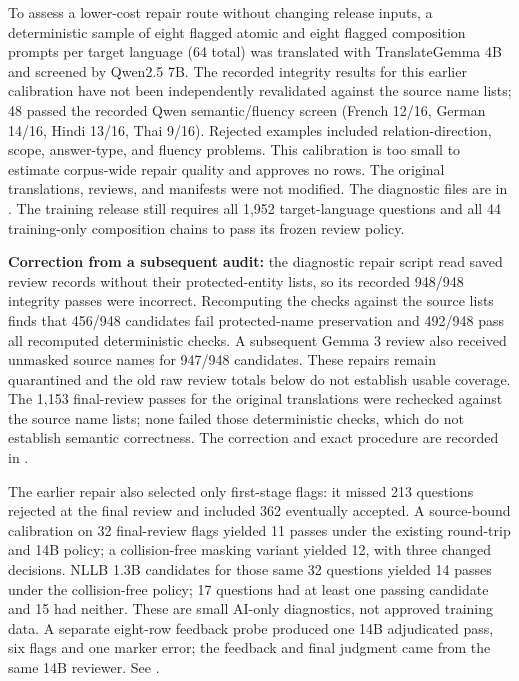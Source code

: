\documentclass[10pt,a4paper]{article}
\begin{document}
To assess a lower-cost repair route without changing release inputs, a deterministic sample of eight flagged atomic and eight flagged composition prompts per target language (64 total) was translated with TranslateGemma 4B and screened by Qwen2.5 7B. The recorded integrity results for this earlier calibration have not been independently revalidated against the source name lists; 48 passed the recorded Qwen semantic/fluency screen (French 12/16, German 14/16, Hindi 13/16, Thai 9/16). Rejected examples included relation-direction, scope, answer-type, and fluency problems. This calibration is too small to estimate corpus-wide repair quality and approves no rows. The original translations, reviews, and manifests were not modified. The diagnostic files are in . The training release still requires all 1,952 target-language questions and all 44 training-only composition chains to pass its frozen review policy.

\textbf{Correction from a subsequent audit:} the diagnostic repair script read saved review records without their protected-entity lists, so its recorded 948/948 integrity passes were incorrect. Recomputing the checks against the source lists finds that 456/948 candidates fail protected-name preservation and 492/948 pass all recomputed deterministic checks. A subsequent Gemma 3 review also received unmasked source names for 947/948 candidates. These repairs remain quarantined and the old raw review totals below do not establish usable coverage. The 1,153 final-review passes for the original translations were rechecked against the source name lists; none failed those deterministic checks, which do not establish semantic correctness. The correction and exact procedure are recorded in .

The earlier repair also selected only first-stage flags: it missed 213 questions rejected at the final review and included 362 eventually accepted. A source-bound calibration on 32 final-review flags yielded 11 passes under the existing round-trip and 14B policy; a collision-free masking variant yielded 12, with three changed decisions. NLLB 1.3B candidates for those same 32 questions yielded 14 passes under the collision-free policy; 17 questions had at least one passing candidate and 15 had neither. These are small AI-only diagnostics, not approved training data. A separate eight-row feedback probe produced one 14B adjudicated pass, six flags and one marker error; the feedback and final judgment came from the same 14B reviewer. See .
\end{document}
